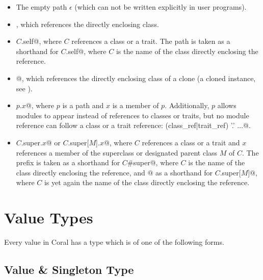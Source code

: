 \begin{itemize}
\item 
The empty path $\epsilon$ (which can not be written explicitly in user programs). 

\item 
{}, which references the directly enclosing class. 

\item 
\lstinline@$C$.self@, where $C$ references a class or a trait. The path  is taken as a shorthand for \lstinline@$C$.self@, where $C$ is the name of the class directly enclosing the reference. 

\item
\lstinline@self[cloned]@, which references the directly enclosing class of a clone (a cloned instance, see ). 

\item 
\lstinline@$p$.$x$@, where $p$ is a path and $x$ is a member of $p$. Additionally, $p$ allows modules to appear instead of references to classes or traits, but no module reference can follow a class or a trait reference:  {(class_ref|trait_ref) '.'} $\ldots$@. 

\item
\lstinline@$C$.super.$x$@ or \lstinline@$C$.super[$M$].$x$@, where $C$ references a class or a trait and $x$ references a member of the superclass or designated parent class $M$ of $C$. The prefix  is taken as a shorthand for \lstinline@$C$#super@, where $C$ is the name of the class directly enclosing the reference, and \lstinline@super[$M$]@ as a shorthand for \lstinline@$C$.super[$M$]@, where $C$ is yet again the name of the class directly enclosing the reference. 
\end{itemize}






\section{Value Types}

Every value in Coral has a type which is of one of the following forms. 






\subsection{Value \& Singleton Type}
\label{sec:value-types}
\label{sec:singleton-types}

